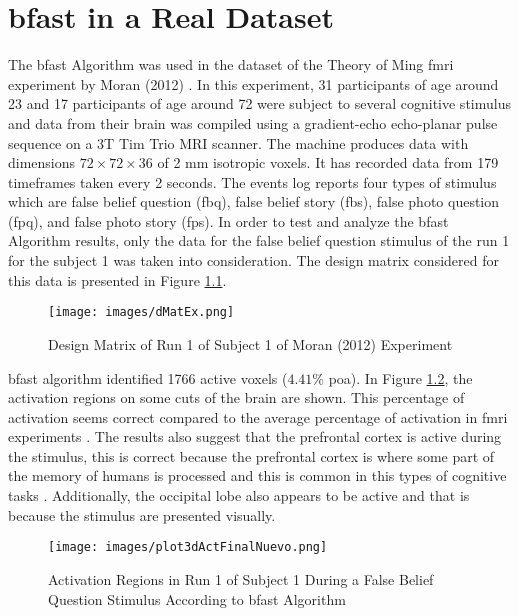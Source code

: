 \chapter{\texorpdfstring{\gls{bfast}}{BFAST} in a Real Dataset}

The \gls{bfast} Algorithm was used in the dataset of the Theory of Ming \gls{fmri} experiment 
by Moran (2012) \cite{moran2012social}. 
In this experiment, 31 participants of age around 23 and 17 participants of age around 72 were 
subject to several cognitive stimulus and data from their brain was compiled using a
gradient-echo echo-planar pulse sequence on a 3T Tim Trio MRI scanner. The machine produces data with  
dimensions $72\times72\times36$ of 2 mm isotropic voxels. It has 
recorded data from 179 timeframes taken every 2 seconds. The events log reports four types of stimulus 
which are false belief question (fbq), false belief story (fbs), false photo question (fpq), and 
false photo story (fps). In order to test and analyze the \gls{bfast} Algorithm results, only 
the data for the false belief question stimulus of the run 1 for the subject 1 was taken into 
consideration. The design matrix considered for this data is presented in Figure \ref{fig:desMatEx}.

\begin{figure}
\centering
\texttt{[image: images/dMatEx.png]}
\caption{Design Matrix of Run 1 of Subject 1 of Moran (2012) Experiment}
\label{fig:desMatEx}
\end{figure}

\gls{bfast} algorithm identified 1766 active voxels ($4.41\%$ \gls{poa}). In Figure
\ref{fig:realDataYZ}, the activation regions on some cuts of the brain are shown. 
This percentage of activation seems correct compared to the average percentage of activation in
\gls{fmri} experiments \cite{lazar2008statistical}. The results also suggest that the prefrontal 
cortex is active during the stimulus, this is correct because the prefrontal cortex is where some
part of the memory of humans is processed and this is common in this types of cognitive 
tasks \cite{amin2012brain}. Additionally, the occipital lobe also appears to be active and that is
because the stimulus are presented visually.

\begin{figure}[htbp!]
\centering
\texttt{[image: images/plot3dActFinalNuevo.png]}
\caption{Activation Regions in Run 1 of Subject 1 During a False Belief Question Stimulus According to \gls{bfast} Algorithm}
\label{fig:realDataYZ}
\end{figure}